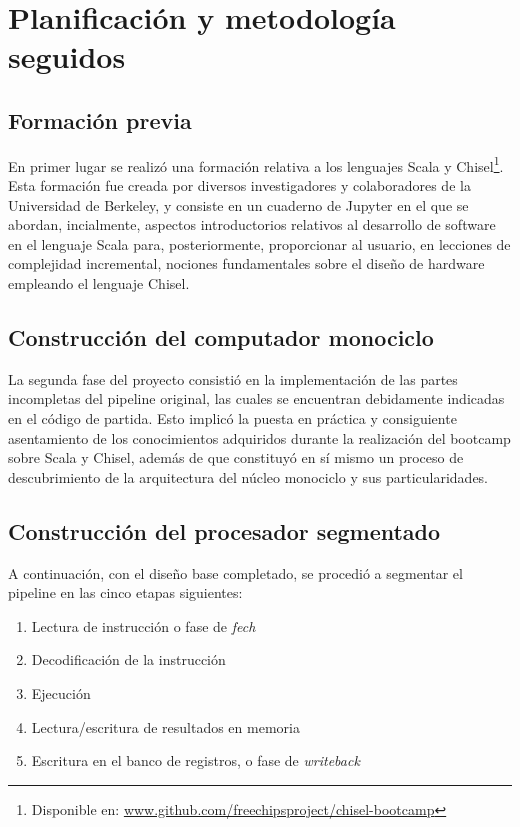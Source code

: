 \section{Planificación y metodología seguidos}

\subsection{Formación previa}

En primer lugar se realizó una formación relativa a los lenguajes Scala y Chisel\footnote{Disponible en: \url{www.github.com/freechipsproject/chisel-bootcamp}}. Esta formación fue creada por diversos investigadores y colaboradores de la Universidad de Berkeley, y consiste en un cuaderno de Jupyter en el que se abordan, incialmente, aspectos introductorios relativos al desarrollo de software en el lenguaje Scala para, posteriormente, proporcionar al usuario, en lecciones de complejidad incremental, nociones fundamentales sobre el diseño de hardware empleando el lenguaje Chisel.

\subsection{Construcción del computador monociclo}

La segunda fase del proyecto consistió en la implementación de las partes incompletas del pipeline original, las cuales se encuentran debidamente indicadas en el código de partida. Esto implicó la puesta en práctica y consiguiente asentamiento de los conocimientos adquiridos durante la realización del bootcamp sobre Scala y Chisel, además de que constituyó en sí mismo un proceso de descubrimiento de la arquitectura del núcleo monociclo y sus particularidades.

\subsection{Construcción del procesador segmentado}

A continuación, con el diseño base completado, se procedió a segmentar el pipeline en las cinco etapas siguientes:

\begin{enumerate}
  \item{Lectura de instrucción o fase de \textit{fech}}
  \vspace{-0.2cm}
  \item{Decodificación de la instrucción}
  \vspace{-0.2cm}
  \item{Ejecución}
  \vspace{-0.2cm}
  \item{Lectura/escritura de resultados en memoria}
  \vspace{-0.2cm}
  \item{Escritura en el banco de registros, o fase de \textit{writeback}}
\end{enumerate}

